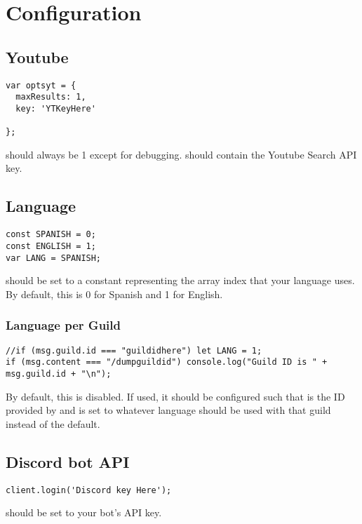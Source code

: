\documentclass{article}
\begin{document}
\section{Configuration}
\subsection{Youtube}
\begin{lstlisting}[frame=single,inputencoding=utf8,showstringspaces=false]
var optsyt = {
  maxResults: 1,
  key: 'YTKeyHere'

};
\end{lstlisting}
 should always be 1 except for debugging.\newline
{} should contain the Youtube Search API key.\par
\subsection{Language}
\begin{lstlisting}[frame=single,inputencoding=utf8,showstringspaces=false]
const SPANISH = 0;
const ENGLISH = 1;
var LANG = SPANISH;
\end{lstlisting}
 should be set to a constant representing the array index that your language uses. By default, this is 0 for Spanish and 1 for English.\par
\subsubsection{Language per Guild}
\begin{lstlisting}[frame=single,inputencoding=utf8,showstringspaces=false,linewidth=18.3cm]
//if (msg.guild.id === "guildidhere") let LANG = 1;
if (msg.content === "/dumpguildid") console.log("Guild ID is " + msg.guild.id + "\n");
\end{lstlisting}
By default, this is disabled. If used, it should be configured such that  is the ID provided by  and  is set to whatever language should be used with that guild instead of the default.\par
\subsection{Discord bot API}
\begin{lstlisting}[frame=single,inputencoding=utf8,showstringspaces=false]
client.login('Discord key Here');
\end{lstlisting}
 should be set to your bot's API key.
\end{document}
